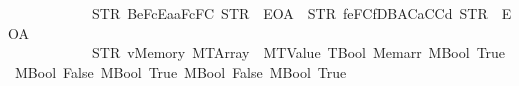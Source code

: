 \begin{isabellebody}
\ \ \ \ \ \ \ \ \ \ \ \ {\isacharbrackleft}{\kern0pt}{\isacharparenleft}{\kern0pt}STR\ {\isacharprime}{\kern0pt}{\isacharprime}{\kern0pt}{}{}{}Be{}{}{}{}FcEa{}{}aF{}{}{}{}{}{}{}{}{}c{}{}F{}{}{}{}{}{}C{}{}{}{\isacharprime}{\kern0pt}{\isacharprime}{\kern0pt}{\isacharcomma}{\kern0pt}\ STR\ {\isacharprime}{\kern0pt}{\isacharprime}{\kern0pt}{}{}{}{\isacharprime}{\kern0pt}{\isacharprime}{\kern0pt}{\isacharcomma}{\kern0pt}\ EOA{\isacharcomma}{\kern0pt}\ {}{\isacharparenright}{\kern0pt}{\isacharcomma}{\kern0pt}\ {\isacharparenleft}{\kern0pt}STR\ {\isacharprime}{\kern0pt}{\isacharprime}{\kern0pt}{}{}{}f{}e{}F{}{}{}{}{}C{}{}f{}DB{}AC{}{}{}{}{}a{}CC{}{}{}{}{}d{}{}{\isacharprime}{\kern0pt}{\isacharprime}{\kern0pt}{\isacharcomma}{\kern0pt}\ STR\ {\isacharprime}{\kern0pt}{\isacharprime}{\kern0pt}{}{}{}{\isacharprime}{\kern0pt}{\isacharprime}{\kern0pt}{\isacharcomma}{\kern0pt}\ EOA{\isacharcomma}{\kern0pt}\ {}{\isacharparenright}{\kern0pt}{\isacharbrackright}{\kern0pt}\ \isanewline
\ \ \ \ \ \ \ \ \ \ \ \ {\isacharbrackleft}{\kern0pt}{\isacharparenleft}{\kern0pt}STR\ {\isacharprime}{\kern0pt}{\isacharprime}{\kern0pt}v{}{\isacharprime}{\kern0pt}{\isacharprime}{\kern0pt}{\isacharcomma}{\kern0pt}{\isacharparenleft}{\kern0pt}Memory\ {\isacharparenleft}{\kern0pt}MTArray\ {}\ {\isacharparenleft}{\kern0pt}MTValue\ TBool{\isacharparenright}{\kern0pt}{\isacharparenright}{\kern0pt}{\isacharcomma}{\kern0pt}\ Memarr\ {\isacharbrackleft}{\kern0pt}MBool\ True{\isacharcomma}{\kern0pt}\ MBool\ False{\isacharcomma}{\kern0pt}\ MBool\ True{\isacharcomma}{\kern0pt}\ MBool\ False{\isacharcomma}{\kern0pt}\ MBool\ True{\isacharbrackright}{\kern0pt}{\isacharparenright}{\kern0pt}{\isacharparenright}{\kern0pt}{\isacharbrackright}{\kern0pt}\isanewline

\end{isabellebody}
